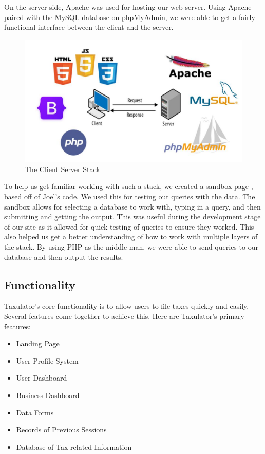 \documentclass[sigconf]{acmart}
\begin{document}
On the server side, Apache was used for hosting our web server. Using Apache paired with the MySQL database on phpMyAdmin, we were able to get a fairly functional interface between the client and the server.

\begin{figure}[H]
  \label{Stack}
  \centering
  \includegraphics[width=\linewidth]{Images/ClientServer.jpg}
  \caption{The Client Server Stack}
\end{figure}

To help us get familiar working with such a stack, we created a sandbox page \cite{Sandbox}, based off of Joel’s code. We used this for testing out queries with the data. The sandbox allows for selecting a database to work with, typing in a query, and then submitting and getting the output. This was useful during the development stage of our site as it allowed for quick testing of queries to ensure they worked. This also helped us get a better understanding of how to work with multiple layers of the stack. By using PHP as the middle man, we were able to send queries to our database and then output the results.

\subsection{Functionality}
Taxulator’s core functionality is to allow users to file taxes quickly and easily. Several features come together to achieve this. Here are Taxulator’s primary features:
\begin{itemize}
\item Landing Page
\item User Profile System
\item User Dashboard
\item Business Dashboard
\item Data Forms
\item Records of Previous Sessions
\item Database of Tax-related Information
\end{itemize}
\end{document}
